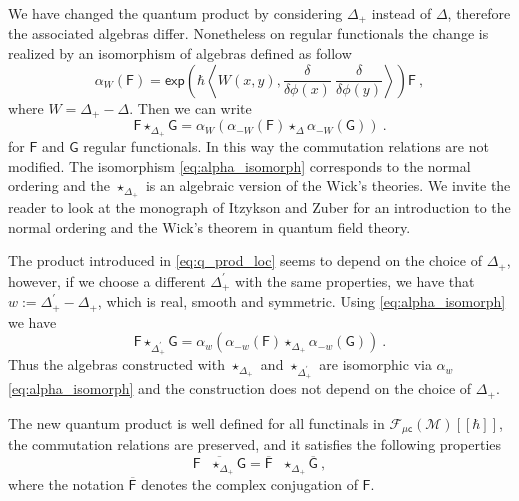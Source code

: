 \documentclass[11pt]{book}
\newcommand{\hilight}[1]{\colorbox{yellow!80!black}{#1}}
\renewcommand{\exp}{\mathsf{exp}}
\newcommand{\muc}{\mu\csf}
\newcommand{\sm}[1]{\left\langle#1\right\rangle}
\newcommand{\Fcal}{\mathcal{F}}
\newcommand{\Mcal}{\mathcal{M}}
\newcommand{\Fsf}{\mathsf{F}}
\newcommand{\Gsf}{\mathsf{G}}
\newcommand{\csf}{\mathsf{c}}
\theoremstyle{break}
\begin{document}
\bigskip


We have changed the quantum product by considering $\Delta_+$ instead of $\Delta$, therefore the associated algebras differ. Nonetheless on regular functionals the change is realized by an isomorphism of algebras defined as follow
%
\begin{equation}
\alpha_{W}(\Fsf) = \exp\left(\hbar \sm{ W(x,y) , \frac{\delta}{\delta\phi(x)} \ \frac{\delta}{\delta\phi(y)} } \right) \Fsf \ ,
\label{eq:alpha_isomorph} 
\end{equation}
%
where \hilight{$W = \Delta_+ - \Delta$}. Then we can write
%
\begin{equation*}
\Fsf \star_{\Delta_+} \Gsf = \alpha_W \left(\alpha_{-W}(\Fsf) \star_{\Delta} \alpha_{-W}(\Gsf)\right) \ .
\end{equation*}
%
for $\Fsf$ and $\Gsf$ regular functionals. In this way the commutation relations are not modified. The isomorphism \eqref{eq:alpha_isomorph} corresponds to the normal ordering and the $\star_{\Delta_+}$ is an algebraic version of the Wick's theories. We invite the reader to look at the monograph of Itzykson and Zuber \cite{itzykson_quantum_1980} for an introduction to the normal ordering and the Wick's theorem in quantum field theory. 


\bigskip


The product introduced in \eqref{eq:q_prod_loc} seems to depend on the choice of $\Delta_+$, however, if we choose a different $\Delta^\prime_+$ with the same properties, we have that $w:=\Delta^\prime_+ - \Delta_+$, which is real, smooth and symmetric. Using \eqref{eq:alpha_isomorph} we have
%
\begin{equation}
\Fsf \star_{\Delta^\prime_+} \Gsf = \alpha_w \left(\alpha_{-w}(\Fsf) \star_{\Delta_+} \alpha_{-w}(\Gsf)\right) \ .
\end{equation}
%
Thus the algebras constructed with $\star_{\Delta_+}$ and $\star_{\Delta^\prime_+}$ are isomorphic via $\alpha_{w}$ \eqref{eq:alpha_isomorph} and the construction does not depend on the choice of $\Delta_+$.


\bigskip


The new quantum product is well defined for all functinals in $\Fcal_{\muc}(\Mcal)[[\hbar]]$, the commutation relations are preserved, and it satisfies the following properties
%
\begin{equation*}
\overline{\Fsf \ \ \ \star_{\Delta_+} \Gsf} = \overline{\Fsf} \ \ \ \star_{\Delta_+} \overline{\Gsf} \ ,
\end{equation*}
%
where the notation $\overline{\Fsf}$ denotes the complex conjugation of $\Fsf$.
\end{document}
